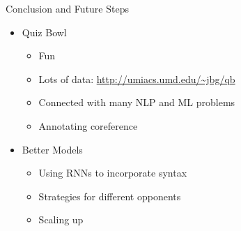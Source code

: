 \documentclass[compress]{beamer}
\begin{document}

\iflong
	
\fi



\iflong
	
\else
	\begin{frame}{Conclusion and Future Steps}
	\begin{itemize}
		\item Quiz Bowl
		\begin{itemize}
			\item Fun
			\item Lots of data: \url{http://umiacs.umd.edu/~jbg/qb}
			\item Connected with many NLP and ML problems
                        \item Annotating coreference
		\end{itemize}
		\item Better Models
		\begin{itemize}
			\item Using RNNs to incorporate syntax
			\item Strategies for different opponents
                        \item Scaling up
		\end{itemize}
	\end{itemize}
	\end{frame}
\fi




\begin{frame}

\tiny

\end{frame}
\end{document}
